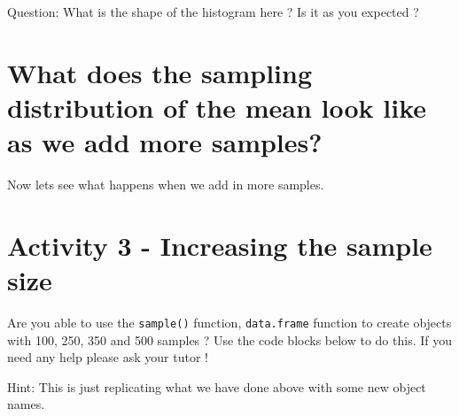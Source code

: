 \documentclass[
]{book}
\newenvironment{Shaded}{\begin{snugshade}}{\end{snugshade}}
\newcommand{\AttributeTok}[1]{\textcolor[rgb]{0.13,0.29,0.53}{#1}}
\newcommand{\CommentTok}[1]{\textcolor[rgb]{0.56,0.35,0.01}{\textit{#1}}}
\newcommand{\DecValTok}[1]{\textcolor[rgb]{0.00,0.00,0.81}{#1}}
\newcommand{\FunctionTok}[1]{\textcolor[rgb]{0.13,0.29,0.53}{\textbf{#1}}}
\newcommand{\NormalTok}[1]{#1}
\newcommand{\OtherTok}[1]{\textcolor[rgb]{0.56,0.35,0.01}{#1}}
\newcommand{\SpecialCharTok}[1]{\textcolor[rgb]{0.81,0.36,0.00}{\textbf{#1}}}
\begin{document}
Question: What is the shape of the histogram here ? Is it as you expected ?

\section{What does the sampling distribution of the mean look like as we add more samples?}\label{what-does-the-sampling-distribution-of-the-mean-look-like-as-we-add-more-samples}

Now lets see what happens when we add in more samples.

\section{Activity 3 - Increasing the sample size}\label{activity-3---increasing-the-sample-size}

Are you able to use the \texttt{sample()} function, \texttt{data.frame} function to create objects with 100, 250, 350 and 500 samples ? Use the code blocks below to do this.
If you need any help please ask your tutor !

Hint: This is just replicating what we have done above with some new object names.

\begin{Shaded}
\end{Shaded}
\end{document}
